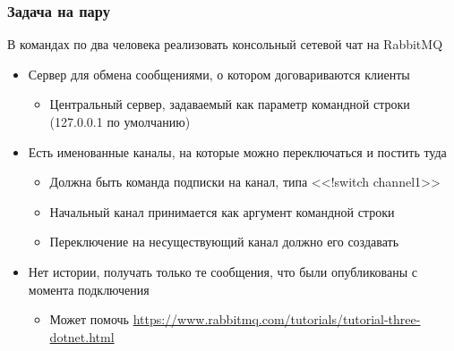 \documentclass{../../slides-style}
\begin{document}
    \begin{frame}
        \frametitle{Задача на пару}
        В командах по два человека реализовать консольный сетевой чат на RabbitMQ
        \begin{itemize}
            \item Сервер для обмена сообщениями, о котором договариваются клиенты
            \begin{itemize}
                \item Центральный сервер, задаваемый как параметр командной строки (127.0.0.1 по умолчанию)
            \end{itemize}
            \item Есть именованные каналы, на которые можно переключаться и постить туда
            \begin{itemize}
                \item Должна быть команда подписки на канал, типа <<!switch channel1>>
                \item Начальный канал принимается как аргумент командной строки
                \item Переключение на несуществующий канал должно его создавать
            \end{itemize}
            \item Нет истории, получать только те сообщения, что были опубликованы с момента подключения
            \begin{itemize}
                \item Может помочь \url{https://www.rabbitmq.com/tutorials/tutorial-three-dotnet.html}
            \end{itemize}
        \end{itemize}
    \end{frame}
\end{document}
